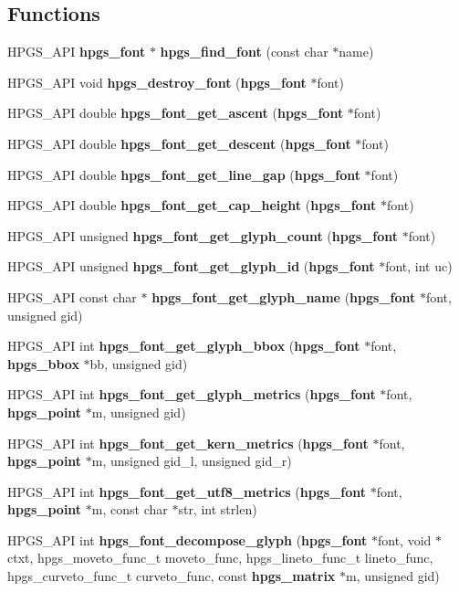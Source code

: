 \subsection*{Functions}
\begin{CompactItemize}
\item 
HPGS\_\-API {\bf hpgs\_\-font} $\ast$ {\bf hpgs\_\-find\_\-font} (const char $\ast$name)
\item 
HPGS\_\-API void {\bf hpgs\_\-destroy\_\-font} ({\bf hpgs\_\-font} $\ast$font)
\item 
HPGS\_\-API double {\bf hpgs\_\-font\_\-get\_\-ascent} ({\bf hpgs\_\-font} $\ast$font)
\item 
HPGS\_\-API double {\bf hpgs\_\-font\_\-get\_\-descent} ({\bf hpgs\_\-font} $\ast$font)
\item 
HPGS\_\-API double {\bf hpgs\_\-font\_\-get\_\-line\_\-gap} ({\bf hpgs\_\-font} $\ast$font)
\item 
HPGS\_\-API double {\bf hpgs\_\-font\_\-get\_\-cap\_\-height} ({\bf hpgs\_\-font} $\ast$font)
\item 
HPGS\_\-API unsigned {\bf hpgs\_\-font\_\-get\_\-glyph\_\-count} ({\bf hpgs\_\-font} $\ast$font)
\item 
HPGS\_\-API unsigned {\bf hpgs\_\-font\_\-get\_\-glyph\_\-id} ({\bf hpgs\_\-font} $\ast$font, int uc)
\item 
HPGS\_\-API const char $\ast$ {\bf hpgs\_\-font\_\-get\_\-glyph\_\-name} ({\bf hpgs\_\-font} $\ast$font, unsigned gid)
\item 
HPGS\_\-API int {\bf hpgs\_\-font\_\-get\_\-glyph\_\-bbox} ({\bf hpgs\_\-font} $\ast$font, {\bf hpgs\_\-bbox} $\ast$bb, unsigned gid)
\item 
HPGS\_\-API int {\bf hpgs\_\-font\_\-get\_\-glyph\_\-metrics} ({\bf hpgs\_\-font} $\ast$font, {\bf hpgs\_\-point} $\ast$m, unsigned gid)
\item 
HPGS\_\-API int {\bf hpgs\_\-font\_\-get\_\-kern\_\-metrics} ({\bf hpgs\_\-font} $\ast$font, {\bf hpgs\_\-point} $\ast$m, unsigned gid\_\-l, unsigned gid\_\-r)
\item 
HPGS\_\-API int {\bf hpgs\_\-font\_\-get\_\-utf8\_\-metrics} ({\bf hpgs\_\-font} $\ast$font, {\bf hpgs\_\-point} $\ast$m, const char $\ast$str, int strlen)
\item 
HPGS\_\-API int {\bf hpgs\_\-font\_\-decompose\_\-glyph} ({\bf hpgs\_\-font} $\ast$font, void $\ast$ctxt, hpgs\_\-moveto\_\-func\_\-t moveto\_\-func, hpgs\_\-lineto\_\-func\_\-t lineto\_\-func, hpgs\_\-curveto\_\-func\_\-t curveto\_\-func, const {\bf hpgs\_\-matrix} $\ast$m, unsigned gid)

\end{CompactItemize}
